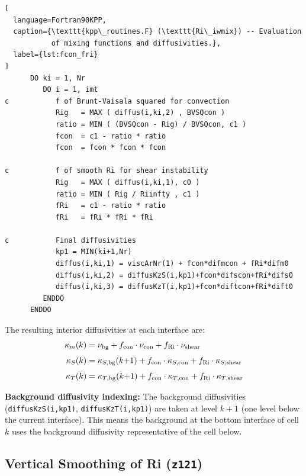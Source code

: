 \documentclass[12pt,letterpaper]{article}
\newcommand{\Ri}{\mathrm{Ri}}
\begin{document}
\begin{lstlisting}[  
  language=Fortran90KPP,  
  caption={\texttt{kpp\_routines.F} (\texttt{Ri\_iwmix}) -- Evaluation  
           of mixing functions and diffusivities.},  
  label={lst:fcon_fri}  
]  
      DO ki = 1, Nr  
         DO i = 1, imt  
c           f of Brunt-Vaisala squared for convection  
            Rig   = MAX ( diffus(i,ki,2) , BVSQcon )  
            ratio = MIN ( (BVSQcon - Rig) / BVSQcon, c1 )  
            fcon  = c1 - ratio * ratio  
            fcon  = fcon * fcon * fcon  
  
c           f of smooth Ri for shear instability  
            Rig   = MAX ( diffus(i,ki,1), c0 )  
            ratio = MIN ( Rig / Riinfty , c1 )  
            fRi   = c1 - ratio * ratio  
            fRi   = fRi * fRi * fRi  
  
c           Final diffusivities  
            kp1 = MIN(ki+1,Nr)  
            diffus(i,ki,1) = viscArNr(1) + fcon*difmcon + fRi*difm0  
            diffus(i,ki,2) = diffusKzS(i,kp1)+fcon*difscon+fRi*difs0  
            diffus(i,ki,3) = diffusKzT(i,kp1)+fcon*diftcon+fRi*dift0  
         ENDDO  
      ENDDO  
\end{lstlisting}  
  
The resulting interior diffusivities at each interface are:  
\begin{align}  
\kappa_m(k) &= \nu_{\rm bg} + f_{\rm con} \cdot \nu_{\rm con}  
               + f_\Ri \cdot \nu_{\rm shear} \\[4pt]  
\kappa_S(k) &= \kappa_{S,{\rm bg}}(k{+}1) + f_{\rm con} \cdot  
               \kappa_{S,{\rm con}} + f_\Ri \cdot \kappa_{S,{\rm shear}} \\[4pt]  
\kappa_T(k) &= \kappa_{T,{\rm bg}}(k{+}1) + f_{\rm con} \cdot  
               \kappa_{T,{\rm con}} + f_\Ri \cdot \kappa_{T,{\rm shear}}  
\end{align}  
  
\begin{infobox}  
\textbf{Background diffusivity indexing:} The background diffusivities  
(\texttt{diffusKzS(i,kp1)}, \texttt{diffusKzT(i,kp1)}) are taken at  
level $k+1$ (one level below the current interface). This means the  
background at the bottom interface of cell $k$ uses the background  
diffusivity representative of the cell below.  
\end{infobox}  
  
\subsection{Vertical Smoothing of Ri (\texttt{z121})}  
  
\end{document}

